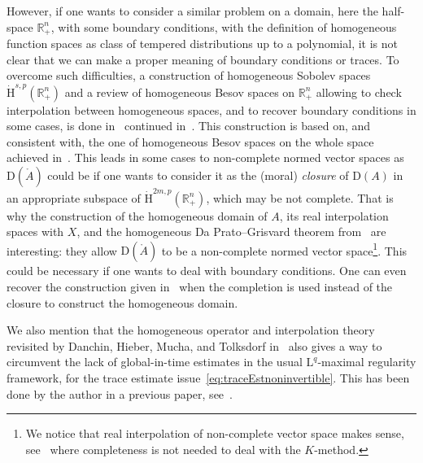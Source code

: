 \documentclass[10pt]{amsart}
\theoremstyle{definition}\newtheorem{defi}[theo]{Definition}\newtheorem{rema}[theo]{Remark}\newtheorem{exam}[theo]{Example}\newtheorem{exem}[theo]{Example}\newtheorem{nota}[theo]{Notation}
\newcommand{\bbR}{\mathbb{R}}
\newcommand{\rmH}{\mathrm{H}}%
\newcommand{\rmD}{\mathrm{D}}
\newcommand{\rmL}{\mathrm{L}}
\newcommand{\rgA}{\mathring{A}}
\begin{document}
However, if one wants to consider a similar problem on a domain, here the half-space $\bbR^n_+$, with some boundary conditions, with the definition of homogeneous function spaces as class of tempered distributions up to a polynomial, it is not clear that we can make a proper meaning of boundary conditions or traces. To overcome such difficulties, a construction of homogeneous Sobolev spaces $\dot{\rmH}^{s,p}(\bbR^n_+)$ and a review of homogeneous Besov spaces on $\bbR^n_+$ allowing to check interpolation between homogeneous spaces, and to recover boundary conditions in some cases, is done in~\cite[Chapters~3~\&~4]{DanchinHieberMuchaTolk2020} continued in~\cite{Gaudin2022}. This construction is based on, and consistent with, the one of homogeneous Besov spaces on the whole space achieved in~\cite[Chapter~2]{bookBahouriCheminDanchin}. This leads in some cases to non-complete normed vector spaces as $\rmD(\rgA)$ could be if one wants to consider it as the (moral) \emph{closure} of $\rmD(A)$ in an appropriate subspace of $\dot{\rmH}^{2m,p}(\bbR^n_+)$, which may be not complete. That is why the construction of the homogeneous domain of $A$, its real interpolation spaces with $X$, and the homogeneous Da Prato--Grisvard theorem from~\cite[Chapter~2]{DanchinHieberMuchaTolk2020} are interesting: they allow $\rmD(\rgA)$ to be a non-complete normed vector space\footnote{We notice that real interpolation of non-complete vector space makes sense, see~\cite[Chapter~3]{BerghLofstrom1976} where completeness is not needed to deal with the $K$-method.}. This could be necessary if one wants to deal with boundary conditions. One can even recover the construction given in~\cite[Chapter~6]{bookHaase2006} when the completion is used instead of the closure to construct the homogeneous domain.

We also mention that the homogeneous operator and interpolation theory revisited by Danchin, Hieber, Mucha, and Tolksdorf in~\cite[Chapter~2]{DanchinHieberMuchaTolk2020} also gives a way to circumvent the lack of global-in-time estimates in the usual $\rmL^q$-maximal regularity framework, for the trace estimate issue~\eqref{eq:traceEstnoninvertible}. This has been done by the author in a previous paper, see~\cite[Sections~1,~2\&~4]{Gaudin2023}.
\end{document}
